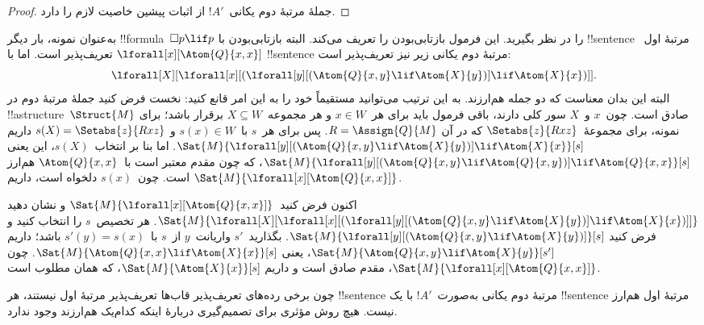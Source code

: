\documentclass[../../../include/open-logic-section]{subfiles}
\begin{document}
\begin{proof}
  جملهٔ مرتبهٔ دوم یکانی~$!A'$ از اثبات پیشین خاصیت لازم را دارد.
\end{proof}

به‌عنوان نمونه، بار دیگر !!{formula}~$\Box p \lif p$ را در نظر بگیرید.
این فرمول بازتابی‌بودن را تعریف می‌کند. البته بازتابی‌بودن با
!!{sentence} مرتبهٔ اول~$\lforall[x][\Atom{Q}{x,x}]$ تعریف‌پذیر است.
اما با !!{sentence} مرتبهٔ دوم یکانی زیر نیز تعریف‌پذیر است:
\[
\lforall[X][\lforall[x][(\lforall[y][(\Atom{Q}{x,y} \lif \Atom{X}{y})]
    \lif \Atom{X}{x})]].
\]
البته این بدان معناست که دو جمله هم‌ارزند. به این ترتیب می‌توانید
مستقیماً خود را به این امر قانع کنید: نخست فرض کنید جملهٔ مرتبهٔ دوم در
!!a{structure}~$\Struct{M}$ صادق است. چون~$x$ و~$X$ سور کلی دارند،
باقی فرمول باید برای هر~$x \in W$ و هر مجموعه~$X \subseteq W$ برقرار
باشد؛ برای نمونه، برای مجموعهٔ~$\Setabs{z}{Rxz}$ که در آن
$R = \Assign{Q}{M}$. پس برای هر~$s$ با~$s(x) \in W$ و
$s(X) = \Setabs{z}{Rxz}$ داریم
$\Sat{M}{\lforall[y][(\Atom{Q}{x,y} \lif
    \Atom{X}{y})] \lif \Atom{X}{x}}[s]$. اما بنا بر انتخاب~$s(X)$،
این یعنی
$\Sat{M}{\lforall[y][(\Atom{Q}{x,y} \lif
    \Atom{Q}{x,y})] \lif \Atom{Q}{x,x}}[s]$، که چون مقدم معتبر است
با~$\Atom{Q}{x,x}$ هم‌ارز است. چون~$s(x)$ دلخواه است، داریم
$\Sat{M}{\lforall[x][\Atom{Q}{x,x}]}$.

اکنون فرض کنید~$\Sat{M}{\lforall[x][\Atom{Q}{x,x}]}$ و نشان دهید
$\Sat{M}{\lforall[X][\lforall[x][(\lforall[y][(\Atom{Q}{x,y} \lif
        \Atom{X}{y})] \lif \Atom{X}{x})]]}$. هر تخصیص~$s$ را انتخاب
کنید و فرض کنید
$\Sat{M}{\lforall[y][(\Atom{Q}{x,y} \lif \Atom{X}{y})]}[s]$.
بگذارید~$s'$ واریانت~$y$ از~$s$ با~$s'(y) = s(x)$ باشد؛ داریم
$\Sat{M}{\Atom{Q}{x,y} \lif \Atom{X}{y}}[s']$، یعنی
$\Sat{M}{\Atom{Q}{x,x} \lif \Atom{X}{x}}[s]$. چون
$\Sat{M}{\lforall[x][\Atom{Q}{x,x}]}$، مقدم صادق است و داریم
$\Sat{M}{\Atom{X}{x}}[s]$، که همان مطلوب است.

چون برخی رده‌های تعریف‌پذیر قاب‌ها تعریف‌پذیر مرتبهٔ اول نیستند، هر
!!{sentence} مرتبهٔ دوم یکانی به‌صورت~$!A'$ با یک !!{sentence} مرتبهٔ
اول هم‌ارز نیست. هیچ روش مؤثری برای تصمیم‌گیری دربارهٔ اینکه کدام‌یک
هم‌ارزند وجود ندارد.
\end{document}
